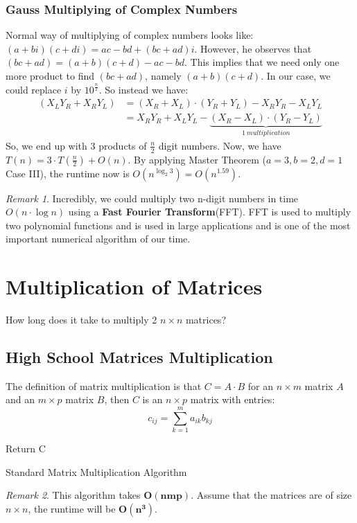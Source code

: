 \documentclass[11pt, a4paper, oneside]{book}
\theoremstyle{theoremdd}
\theoremstyle{remark}
\newtheorem*{remark}{Remark}
\begin{document}
\subsubsection*{Gauss Multiplying of Complex Numbers}
Normal way of multiplying of complex numbers looks like: $(a+bi)(c+di) = ac - bd + (bc+ad)i$. However, he observes that $(bc+ad) = (a+b)(c+d) - ac - bd$. This implies that we need only one more product to find $(bc+ad)$, namely $(a+b)(c+d)$. In our case, we could replace $i$ by $10^{\frac{n}{2}}$. So instead we have: 
\begin{align*}
(X_{L}Y_{R} + X_{R}Y_{L}) & = (X_{R} + X_{L})\cdot (Y_{R} + Y_{L}) - X_{R}Y_{R}-X_{L}Y_{L} \\&
							= X_{R}Y_{R} + X_{L}Y_{L} - \underbrace{(X_{R}-X_{L})\cdot (Y_{R} - Y_{L})}_{1 \ multiplication}
\end{align*}
So, we end up with 3 products of $\frac{n}{2}$ digit numbers. Now, we have $T(n) = 3\cdot T(\frac{n}{2}) + O(n)$. By applying Master Theorem ($a=3, b=2, d=1$ \Rightarrow Case III), the runtime now is $O(n^{\log_{2} 3}) = O(n^{1.59})$.
\begin{remark}
Incredibly, we could multiply two n-digit numbers in time $O(n\cdot \log n)$ using a \textbf{Fast Fourier Transform}(FFT). FFT is used to multiply two polynomial functions and is used in large applications and is one of the most important numerical algorithm of our time. 
\end{remark}

\section{Multiplication of Matrices}
How long does it take to multiply 2 $n\times n$ matrices?

\subsection{High School Matrices Multiplication}
The definition of matrix multiplication is that $C = A\cdot B$ for an $n\times m$ matrix $A$ and an $m\times p$ matrix $B$, then $C$ is an $n\times p$ matrix with entries: \\
\[
  c_{ij} = \sum_{k=1}^{m}a_{ik}b_{kj}
\]
\begin{algorithm}[H]
\SetAlgoLined
{}
Return C\;
\caption{Standard Matrix Multiplication Algorithm}
\end{algorithm}
\begin{remark}
This algorithm takes $\mathbf{O(nmp)}$. Assume that the matrices are of size $n\times n$, the runtime will be $\mathbf{O(n^3)}$.
\end{remark}
\end{document}
